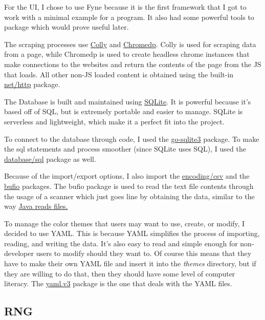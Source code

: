 For the UI, I chose to use Fyne because it is the first framework
that I got to work with a minimal example for a program. It also had
some powerful tools to package which would prove useful later.

The scraping processes use \href{http://go-colly.org/docs/}{Colly}
and \href{https://pkg.go.dev/github.com/chromedp/chromedp}{Chromedp}.
Colly is used for scraping data from a page, while Chromedp is used
to create headless chrome instances that make connections to the
websites and return the contents of the page from the JS that loads.
All other non-JS loaded content is obtained using the built-in
\href{https://pkg.go.dev/net/http}{net/http} package.

The Database is built and maintained using
\href{https://www.sqlite.org/index.html}{SQLite}. It is powerful
because it's based off of SQL, but is extremely portable and easier to manage.
SQLite is serverless and lightweight, which make it a perfect fit
into the project.

To connect to the database through code, I used the
\href{https://pkg.go.dev/github.com/mattn/go-sqlite3}{go-sqlite3} package.
To make the sql statements and process smoother (since SQLite uses
SQL), I used the \href{https://pkg.go.dev/database/sql}{database/sql}
package as well.

Because of the import/export options, I also import the
\href{https://pkg.go.dev/encoding/csv}{encoding/csv} and the
\href{https://pkg.go.dev/bufio}{bufio} packages.
The bufio package is used to read the text file contents through the
usage of a scanner which just goes line by obtaining the data,
similar to the way
\href{https://docs.oracle.com/javase/8/docs/api/java/util/Scanner.html}{Java
reads files.}

To manage the color themes that users may want to use, create, or
modify, I decided to use YAML. This is because YAML simplifies the
process of importing, reading, and writing the data.
It's also easy to read and simple enough
for non-developer users to modify should they want to. Of course this means that
they have to make their own YAML file and insert it into the
\textit{themes} directory, but if they are willing to do that,
then they should have some level of computer literacy.
The \href{https://pkg.go.dev/gopkg.in/yaml.v3}{yaml.v3} package is
the one that deals with the YAML files.

\subsection{RNG}

